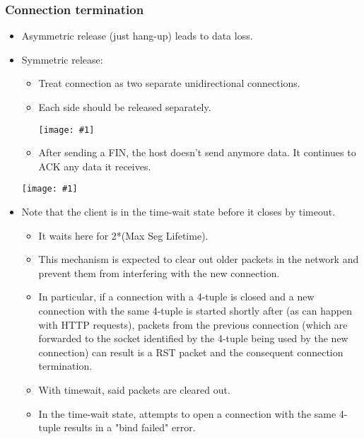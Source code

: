 \documentclass{report}
\makeatletter
\def\maxwidth#1{\ifdim\Gin@nat@width>#1 #1\else\Gin@nat@width\fi}
\newcommand{\mygraphic}[1]{
\begin{center}
    \texttt{[image: \#1]}
\end{center}
}
\makeatother
\begin{document}
\subsubsection{Connection termination}
\begin{itemize}
\item Asymmetric release (just hang-up) leads to data loss.
\item Symmetric release:
\begin{itemize}
\item Treat connection as two separate unidirectional connections.
\item Each side should be released separately.
\mygraphic{rsrc/tcpfinack.png}
\item After sending a FIN, the host doesn't send anymore data. It continues to ACK any data it receives.
\end{itemize}
\mygraphic{rsrc/tcpstate.png}
\item Note that the client is in the time-wait state before it closes by timeout.
\begin{itemize}
    \item It waits here for 2*(Max Seg Lifetime).
    \item This mechanism is expected to clear out older packets in the network and prevent them from interfering with the new connection.
    \item In particular, if a connection with a 4-tuple is closed and a new connection with the same 4-tuple is started shortly after (as can happen with HTTP requests), packets from the previous connection (which are forwarded to the socket identified by the 4-tuple being used by the new connection) can result is a RST packet and the consequent connection termination.
    \item With timewait, said packets are cleared out.
    \item In the time-wait state, attempts to open a connection with the same 4-tuple results in a "bind failed" error.
\end{itemize}

\end{itemize}
\end{document}
